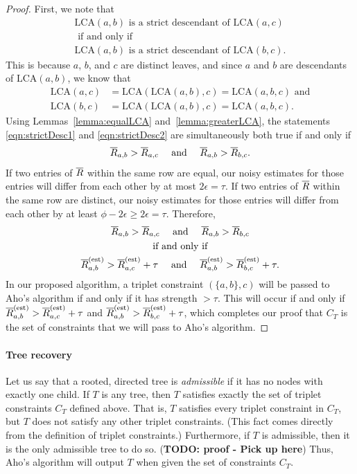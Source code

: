 \documentclass{article}
\theoremstyle{definition}
\newcommand{\LCA}{\text{LCA}}
\newcommand{\RbarEst}{\Rbar^\text{(est)}}
\begin{document}
\begin{proof}
First, we note that
\begin{gather}
\LCA(a,b) \text{ is a strict descendant of } \LCA(a,c) \label{eqn:strictDesc1} \\
\text{ if and only if } \nonumber \\
\LCA(a,b) \text{ is a strict descendant of } \LCA(b,c). \label{eqn:strictDesc2}
\end{gather}
This is because $a$, $b$, and $c$ are distinct leaves, and since $a$ and $b$ are descendants of $\LCA(a,b)$, we know that
\begin{align*}
\LCA(a,c) &= \LCA(\LCA(a,b),c) = \LCA(a,b,c) \text{ and} \\
\LCA(b,c) &= \LCA(\LCA(a,b),c) = \LCA(a,b,c).
\end{align*}
Using Lemmas~\ref{lemma:equalLCA} and~\ref{lemma:greaterLCA}, the statements \eqref{eqn:strictDesc1} and \eqref{eqn:strictDesc2} are simultaneously both true if and only if
\begin{gather*}
\overline{R}_{a,b} > \overline{R}_{a,c}
\quad \text{ and } \quad
\overline{R}_{a,b} > \overline{R}_{b,c}.
\end{gather*}
If two entries of $\overline{R}$ within the same row are equal, our noisy estimates for those entries will differ from each other by at most $2\epsilon = \tau$.
If two entries of $\overline{R}$ within the same row are distinct, our noisy estimates for those entries will differ from each other by at least $\phi - 2\epsilon \geq 2\epsilon = \tau$.
Therefore,
\begin{gather*}
\Rbar_{a,b} > \Rbar_{a,c}
\quad \text{ and } \quad
\Rbar_{a,b} > \Rbar_{b,c} \\
%
\text{ if and only if } \\
%
\RbarEst_{a,b} > \RbarEst_{a,c} + \tau
\quad \text{ and } \quad
\RbarEst_{a,b} > \RbarEst_{b,c} + \tau.
\end{gather*}
In our proposed algorithm, a triplet constraint $(\{a,b\},c)$ will be passed to Aho's algorithm if and only if it has strength $> \tau$.
This will occur if and only if $\RbarEst_{a,b} > \RbarEst_{a,c} + \tau$ and $\RbarEst_{a,b} > \RbarEst_{b,c} + \tau$, which completes our proof that $C_T$ is the set of constraints that we will pass to Aho's algorithm.
\end{proof}

\paragraph{Tree recovery}
Let us say that a rooted, directed tree is \emph{admissible} if it has no nodes with exactly one child.
If $T$ is any tree, then $T$ satisfies exactly the set of triplet constraints $C_T$ defined above.
That is, $T$ satisfies every triplet constraint in $C_T$, but $T$ does not satisfy any other triplet constraints.
(This fact comes directly from the definition of triplet constraints.)
Furthermore, if $T$ is admissible, then it is the only admissible tree to do so.
({\bf TODO: proof - Pick up here})
Thus, Aho's algorithm will output $T$ when given the set of constraints $C_T$.
\end{document}
